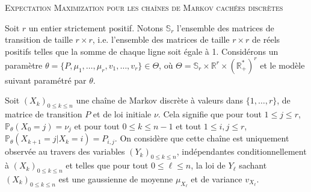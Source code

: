 \documentclass[a4paper,10pt,fleqn]{article}
\newcommand{\1}{\ensuremath{\mathbbm{1}}}
\begin{document}

\noindent\hrulefill

\begin{center}
\textsc{Expectation Maximization pour les cha\^ines de Markov cach\'ees discr\`etes}
\end{center}
\hrulefill

\medskip


Soit $r$ un entier strictement positif.  Notons $\mathbb{S}_r$ l'ensemble des matrices de transition de taille $r\times r$, i.e. l'ensemble des matrices de  taille $r\times r$ de r\'eels positifs telles que la somme de chaque ligne soit \'egale \`a 1. Consid\'erons un param\`etre $\theta= \{P,\mu_1,\ldots,\mu_r,v_1,\ldots,v_r\}\in\Theta$, o\`u $\Theta = \mathbb{S}_r\times \mathbb{R}^r\times(\mathbb{R}_+^*)^r$ et le mod\`ele suivant param\'etr\'e par $\theta$.

Soit $(X_k)_{0\leq k\leq n}$ une cha\^ine de Markov discr\`ete \`a valeurs dans $\{1,\ldots,r\}$, de matrice de transition $P$ et de loi initiale $\nu$. Cela signifie que pour tout $1\leq j \leq r$, $\mathbb{P}_\theta(X_0 = j) = \nu_j$ et pour tout $0\leq k \leq n-1$ et tout $1\leq i,j\leq r$, $\mathbb{P}_\theta(X_{k+1} = j | X_k = i) = P_{i,j}$. On consid\`ere que cette cha\^ine est uniquement observ\'ee au travers des variables $(Y_k)_{0\leq k\leq n}$, ind\'ependantes conditionnellement \`a $(X_k)_{0\leq k\leq n}$ et telles que pour tout $0\leq \ell\leq n$, la loi de $Y_\ell$ sachant $(X_k)_{0\leq k\leq n}$ est une gaussienne de moyenne $\mu_{X_\ell}$ et de variance $v_{X_\ell}$.
\end{document}
